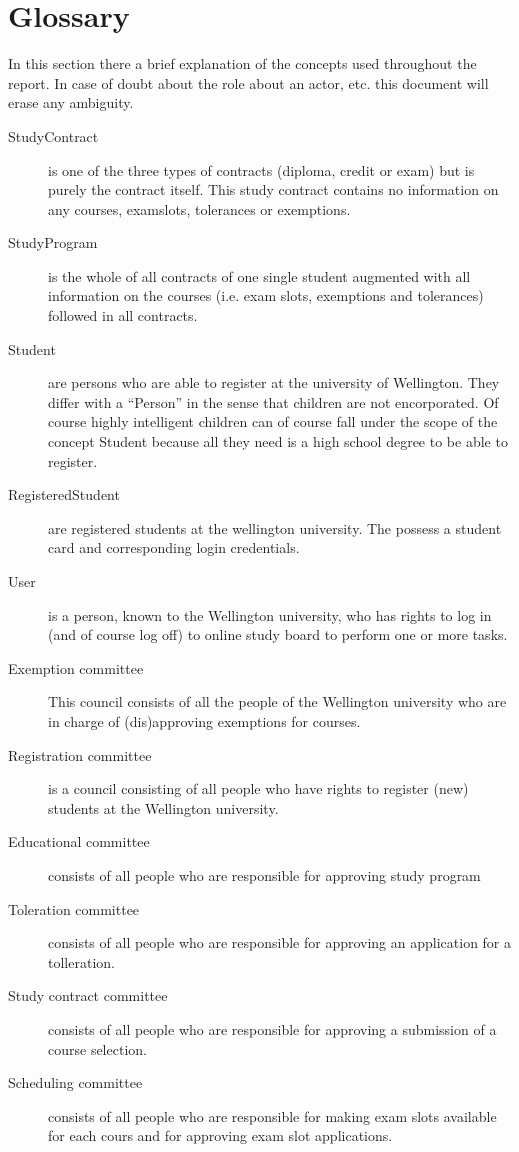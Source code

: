 \chapter{Glossary}
\label{glossary}

\npar In this section there a brief explanation of the concepts used throughout
the report. In case of doubt about the role about an actor, etc. this document
will erase any ambiguity.

\begin{description}
\item[]
\item[StudyContract] is one of the three types of contracts (diploma, credit or
exam) but is purely the contract itself. This study contract contains no
information on any courses, examslots, tolerances or exemptions.
\item[StudyProgram] is the whole of all contracts of one single student
augmented with all information on the courses (i.e. exam slots, exemptions and
tolerances) followed in all contracts.
\item[Student] are persons who are able to register at the university of
Wellington. They differ with a ``Person'' in the sense that children are
not encorporated. Of course highly intelligent children can of course fall under
the scope of the concept Student because all they need is a high school degree
to be able to register.
\item[RegisteredStudent] are registered students at the wellington university.
The possess a student card and corresponding login credentials.
\item[User] is a person, known to the Wellington university, who has rights to
log in (and of course log off) to online study board to perform one or more
tasks.
\item[Exemption committee] This council consists of all the people of the
Wellington university who are in charge of (dis)approving exemptions for
courses.
\item[Registration committee] is a council consisting of all people who have
rights to register (new) students at the Wellington university.
\item[Educational committee] consists of all people who are responsible for
approving study program
\item[Toleration committee] consists of all people who are responsible for approving
an application for a tolleration.
\item[Study contract committee] consists of all people who are responsible for
approving a submission of a course selection.
\item[Scheduling committee] consists of all people who are responsible for making
exam slots available for each cours and for approving exam slot applications.
\end{description}
